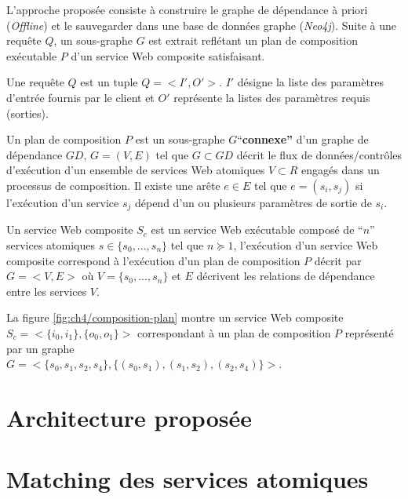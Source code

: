   L'approche proposée consiste à construire le graphe de dépendance à
  priori (\textit{Offline}) et le sauvegarder dans une base de données
  graphe (\textit{Neo4j}). Suite à une requête $Q$, un sous-graphe $G$
  est extrait reflétant un plan de composition exécutable $P$ d'un
  service Web composite satisfaisant.

  \begin{mydef}
    Une requête $Q$ est un tuple $Q = <I', O'>$. $I'$ désigne la liste
    des paramètres d'entrée fournis par le client et $O'$ représente
    la listes des paramètres requis (sorties).
  \end{mydef}

  

  \begin{mydef}
    Un plan de composition $P$ est un sous-graphe
    $G$``\textbf{connexe''} d'un graphe de dépendance $GD$, $G=(V,E)$
    tel que $G \subset GD$ décrit le flux de données/contrôles
    d'exécution d'un ensemble de services Web atomiques $V \subset R$
    engagés dans un processus de composition. Il existe une arête $e
    \in E$ tel que $e = (s_i, s_j)$ si l'exécution d'un service $s_j$
    dépend d'un ou plusieurs paramètres de sortie de $s_i$.
  \end{mydef}

  \begin{mydef}
    Un service Web composite $S_c$ est un service Web exécutable
    composé de ``$n$'' services atomiques $s \in \{s_0,..., s_n\}$ tel
    que $n \succeq 1$, l'exécution d'un service Web composite
    correspond à l'exécution d'un plan de composition $P$ décrit par
    $G=<V,E>$ où $V = \{s_0, ..., s_n\}$ et $E$ décrivent les
    relations de dépendance entre les services $V$.
  \end{mydef}

  La figure \ref{fig:ch4/composition-plan} montre un service Web
  composite $S_c = <\{i_0, i_1\}, \{o_0, o_1\}>$ correspondant à un
  plan de composition $P$ représenté par un graphe\\ $G =<\{s_0, s_1,
  s_2, s_4\}, \{(s_0, s_1), (s_1, s_2), (s_2, s_4)\}>$.

\section{Architecture proposée}
\label{sec:proposition}

\section{Matching des services  atomiques}
\label{sec:ch4/matching}

